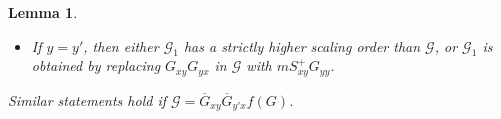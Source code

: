 \documentclass{article}
\newcommand{\1}{\mathds{1}}
\numberwithin{equation}{section}
\newcommand{\ord}{{\rm{ord}}}
\newcommand{\be}{\begin{equation}}
\newcommand{\ee}{\end{equation}}
\renewcommand{\cal}{\mathcal}
\renewcommand{\geq}{\geqslant}
\renewcommand{\ge}{\geq}
\theoremstyle{plain} %
\newtheorem{lemma}[theorem]{Lemma}
\theoremstyle{remark}
\newcommand{\cor}{\color{red}}
\newcommand{\cob}{\color{purple}}
\newcommand{\nc}{\normalcolor}
\newcommand{\hty}[1]{{\cor (ht: #1) }}
\begin{document}
\begin{lemma}
\begin{itemize}
\item[(b)] If $y = y'$, then either $\cal G_1$ has a strictly higher scaling order than $\cal G$, or $\cal G_1$ is obtained by replacing $G_{xy} G_{yx}$ in $\cal G$ with $m S^+_{xy}G_{yy}$.
\end{itemize}
% 
%
Similar statements hold if $\cal G = \overline G_{xy}   \overline  G_{y' x } f(G)$. 
\end{lemma}

\end{document}
